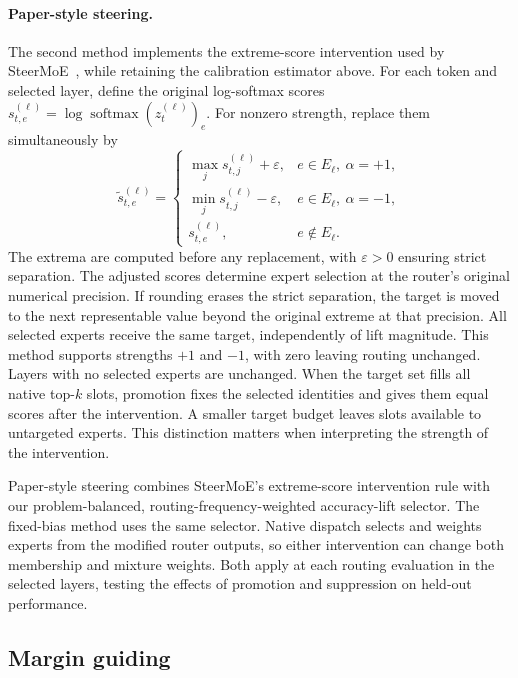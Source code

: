 \documentclass[12pt,a4paper,twoside,openright]{book}
\begin{document}
\paragraph{Paper-style steering.}
The second method implements the extreme-score intervention used by
SteerMoE~\cite{fayyaz2025steermoe}, while retaining the calibration estimator
above. For each token and selected layer, define the
original log-softmax scores $s_{t,e}^{(\ell)}=\log\operatorname{softmax}
(z_t^{(\ell)})_e$. For nonzero strength, replace them simultaneously by
\begin{equation}
  \widetilde s_{t,e}^{(\ell)}=
  \begin{cases}
    \max_j s_{t,j}^{(\ell)}+\varepsilon,
      & e\in E_\ell,\ \alpha=+1,\\
    \min_j s_{t,j}^{(\ell)}-\varepsilon,
      & e\in E_\ell,\ \alpha=-1,\\
    s_{t,e}^{(\ell)}, & e\notin E_\ell.
  \end{cases}
  \label{eq:method-paper-identity-policy}
\end{equation}
The extrema are computed before any replacement, with $\varepsilon>0$
ensuring strict separation. The adjusted scores determine expert selection
at the router's original numerical precision. If rounding erases the strict separation,
the target is moved to the next representable value beyond the original
extreme at that precision. All selected experts receive the same target,
independently of lift magnitude. This method supports strengths $+1$ and
$-1$, with zero leaving routing unchanged. Layers with no
selected experts are unchanged. When the target set fills all native top-$k$
slots, promotion fixes the selected identities and gives them equal scores
after the intervention. A smaller target budget leaves slots available to
untargeted experts. This distinction matters when interpreting the
strength of the intervention.

Paper-style steering combines SteerMoE's extreme-score intervention rule with
our problem-balanced, routing-frequency-weighted accuracy-lift selector. The
fixed-bias method uses the same selector. Native dispatch selects and weights
experts from the modified router outputs, so either intervention can change
both membership and mixture weights. Both apply at each routing evaluation in
the selected layers, testing the effects of promotion and suppression on
held-out performance.

\subsection{Margin guiding}
\label{sec:method-margin}
\end{document}
